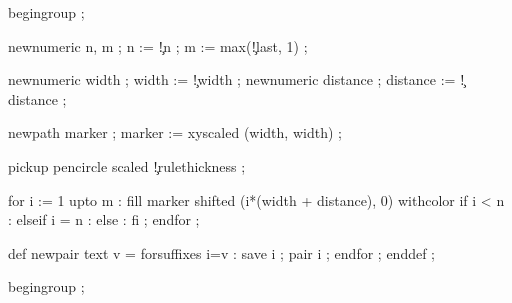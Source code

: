 


  begingroup ;

  newnumeric n, m ;
  n := \visualcounterparameter\c!n ;
  m := max(\visualcounterparameter\c!last, 1) ;

  newnumeric width    ; width    := \visualcounterparameter\c!width    ;
  newnumeric distance ; distance := \visualcounterparameter\c!distance ;

  newpath marker ;
  marker :=  %
            xyscaled (width, width) ;

  pickup pencircle scaled \visualcounterparameter\c!rulethickness ;

  for i := 1 upto m :
    fill marker shifted (i*(width + distance), 0) withcolor
          if i < n     :  
          elseif i = n : 
          else         : 
          fi ;
  endfor ;
\stopuseMPgraphic




\startMPdefinitions
  def newpair    text v = forsuffixes i=v : save i ; pair    i ; endfor ; enddef ;
\stopMPdefinitions

  begingroup ;

